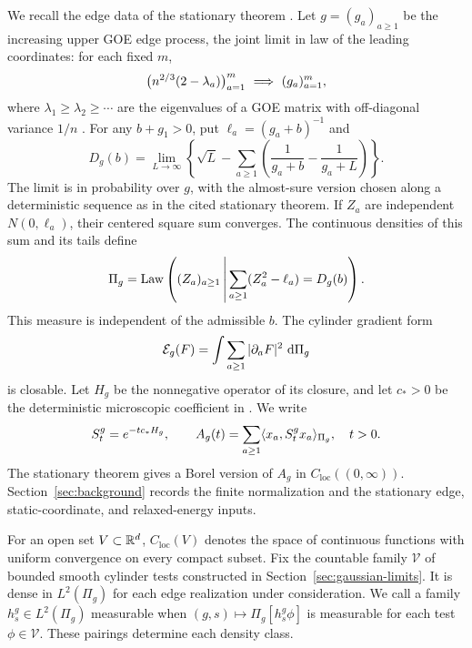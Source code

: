 We recall the edge data of the stationary theorem
\cite[Proposition~2.3, Proposition~5.1, and Theorem~6.8]{FUA}.
Let \(g=(g_a)_{a\ge1}\) be the increasing upper GOE edge process, the
joint limit in law of the leading coordinates: for each fixed \(m\),
\[
 \bigl(n^{2/3}(2-\lambda_a)\bigr)_{a=1}^m
       \ \Longrightarrow\ (g_a)_{a=1}^m ,
\]
where \(\lambda_1\ge\lambda_2\ge\cdots\) are the eigenvalues of a GOE
matrix with off-diagonal variance \(1/n\)
\cite[Theorem~1.1]{RamirezRiderVirag2011}. For any \(b+g_1>0\), put
\(\ell_a=(g_a+b)^{-1}\) and
\begin{equation}\label{eq:edge-D-intro}
 D_g(b)=\lim_{L\to\infty}
 \left\{\sqrt L-\sum_{a\ge1}
 \left(\frac1{g_a+b}-\frac1{g_a+L}\right)\right\}.
\end{equation}
The limit is in probability over \(g\), with the almost-sure version
chosen along a deterministic sequence as in the cited stationary theorem.
If \(Z_a\) are independent \(N(0,\ell_a)\), their centered square sum
converges. The continuous densities of this sum and its tails define
\[
 \Pi_g=\operatorname{Law}\left((Z_a)_{a\ge1}\,\middle|\,
              \sum_{a\ge1}(Z_a^2-\ell_a)=D_g(b)\right).
\]
This measure is independent of the admissible \(b\). The cylinder
gradient form
\[
 \mathcal E_g(F)=\int\sum_{a\ge1}|\partial_aF|^2\,\,\mathrm d\Pi_g
\]
is closable. Let \(H_g\) be the nonnegative operator of its closure, and
let \(c_*>0\) be the deterministic microscopic coefficient in
\cite[Theorem~6.8]{FUA}. We write
\begin{equation}\label{eq:edge-semigroup}
 S_t^g=e^{-t c_*H_g},
 \qquad
 A_g(t)=\sum_{a\ge1}\langle x_a,S_t^g x_a\rangle_{\Pi_g},\quad t>0.
\end{equation}
The stationary theorem gives a Borel version of \(A_g\) in
\(C_{\mathrm{loc}}((0,\infty))\). Section~\ref{sec:background} records the
finite normalization and the stationary edge, static-coordinate, and
relaxed-energy inputs.

For an open set \(V\subset\mathbb R^d\), \(C_{\mathrm{loc}}(V)\) denotes the
space of continuous functions with uniform convergence on every compact
subset. Fix the countable family \(\mathscr V\) of bounded smooth cylinder
tests constructed in Section~\ref{sec:gaussian-limits}. It is dense in
\(L^2(\Pi_g)\) for each edge realization under consideration.
We call a family \(h_s^g\in L^2(\Pi_g)\) measurable
when \((g,s)\mapsto\Pi_g[h_s^g\phi]\) is measurable for each test
\(\phi\in\mathscr V\). These pairings determine each density class.


